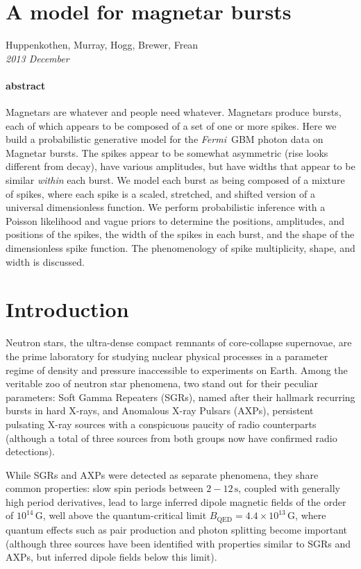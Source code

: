 \documentclass[12pt]{article}
\newcommand{\project}[1]{\textsl{#1}}
\newcommand{\Fermi}{\project{Fermi}}
\begin{document}
\section*{A model for magnetar bursts}

\noindent
Huppenkothen, Murray, Hogg, Brewer, Frean \\
\textsl{2013 December}

\paragraph{abstract}
Magnetars are whatever and people need whatever.
Magnetars produce bursts,
  each of which appears to be composed of a set of one or more spikes.
Here we build a probabilistic generative model for the \Fermi\ GBM photon data on Magnetar bursts.
The spikes appear to be somewhat asymmetric
  (rise looks different from decay),
  have various amplitudes,
  but have widths that appear to be similar \emph{within} each burst.
We model each burst as being composed of a mixture of spikes,
  where each spike is a scaled, stretched, and shifted version of a universal dimensionless function.
We perform probabilistic inference with a Poisson likelihood and vague priors to determine
  the positions, amplitudes, and positions of the spikes,
  the width of the spikes in each burst,
  and the shape of the dimensionless spike function.
The phenomenology of spike multiplicity, shape, and width is discussed.

\section{Introduction}

Neutron stars, the ultra-dense compact remnants of core-collapse supernovae, are the prime laboratory for studying nuclear 
physical processes in a parameter regime of density and pressure inaccessible to experiments on Earth. 
Among the veritable zoo of neutron star phenomena, two stand out for their peculiar parameters: Soft Gamma Repeaters (SGRs),
named after their hallmark recurring bursts in hard X-rays, and Anomalous X-ray Pulsars (AXPs), persistent pulsating X-ray
sources with a conspicuous paucity of radio counterparts (although a total of three sources from both groups now
have confirmed radio detections). 

While SGRs and AXPs were detected as separate phenomena, they share common properties: slow spin periods between
$2 - 12 \, \mathrm{s}$, coupled with generally high period derivatives, lead to large inferred dipole magnetic fields of
the order of $10^{14} \, \mathrm{G}$, well above the quantum-critical limit $B_{\mathrm{QED}} = 4.4 \times 10^{13} \, \mathrm{G}$,
where quantum effects such as pair production and photon splitting become important (although three sources have been 
identified with properties similar to SGRs and AXPs, but inferred dipole fields below this limit). 
\end{document}
